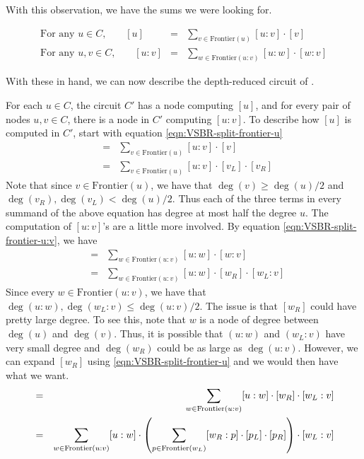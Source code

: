 With this observation, we have the sums we were looking for. 

\begin{eqnarray}\label{eqn:VSBR-split-frontier}
\text{For any $u\in C$,}\quad\quad [u] &=& \sum_{v\in \mathrm{Frontier}(u)} [u:v]\cdot [v] \label{eqn:VSBR-split-frontier-u}\\
\text{For any $u,v\in C$,}\quad\quad [u:v] &=& \sum_{w\in \mathrm{Frontier}(u:v)} [u:w]\cdot [w:v] \label{eqn:VSBR-split-frontier-u:v}
\end{eqnarray}

With these in hand, we can now describe the depth-reduced circuit of \cite{vsbr83}. 

For each $u \in C$, the circuit $C'$ has a node computing $[u]$, and for every pair of nodes $u,v\in C$, there is a node in $C'$ computing $[u:v]$. To describe how $[u]$ is computed in $C'$, start with equation \eqref{eqn:VSBR-split-frontier-u}
\begin{eqnarray*}
[u] &=& \sum_{v\in \mathrm{Frontier}(u)} [u:v]\cdot [v]\\
 & = & \sum_{v\in \mathrm{Frontier}(u)} [u:v] \cdot [v_L] \cdot [v_R]
\end{eqnarray*}
Note that since $v\in \mathrm{Frontier}(u)$, we have that $\deg(v) \geq \deg(u)/2$ and $\deg(v_R),\deg(v_L) < \deg(u)/2$. Thus each of the three terms in every summand of the above equation has degree at most half the degree $u$. The computation of $[u:v]$'s are a little more involved. By equation \eqref{eqn:VSBR-split-frontier-u:v}, we have
\begin{eqnarray*}
[u:v] &=& \sum_{w\in \mathrm{Frontier}(u:v)} [u:w]\cdot [w:v]\\
      &=& \sum_{w\in \mathrm{Frontier}(u:v)} [u:w]\cdot [w_R]\cdot  [w_L:v]
\end{eqnarray*}
Since every $w \in \mathrm{Frontier}(u:v)$, we have that $\deg(u:w),\deg(w_L:v) \leq \deg(u:v)/2$. The issue is that $[w_R]$ could have pretty large degree. To see this, note that $w$ is a node of degree between $\deg(u)$ and $\deg(v)$. Thus, it is possible that $(u:w)$ and $(w_L:v)$ have very small degree and $\deg(w_R)$ could be as large as $\deg(u:v)$. However, we can expand $[w_R]$ using \eqref{eqn:VSBR-split-frontier-u} and we would then have what we want. 
\begin{eqnarray*}
[u:v] &=& \sum_{w\in \mathrm{Frontier}(u:v)} [u:w]\cdot [w_R]\cdot  [w_L:v]\\
      &=& \sum_{w\in \mathrm{Frontier}(u:v)} [u:w]\cdot \inparen{\sum_{p \in \mathrm{Frontier}(w_L)} [w_R:p] \cdot [p_L] \cdot [p_R]} \cdot  [w_L:v]
\end{eqnarray*}

